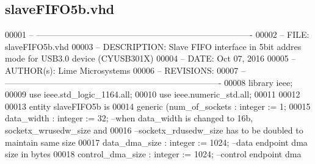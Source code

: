 \subsection{slave\+F\+I\+F\+O5b.\+vhd}
\label{slaveFIFO5b_8vhd_source}

\begin{DoxyCode}
00001 \textcolor{keyword}{-- ---------------------------------------------------------------------------- }
00002 \textcolor{keyword}{-- FILE:    slaveFIFO5b.vhd}
00003 \textcolor{keyword}{-- DESCRIPTION: Slave FIFO interface in 5bit addres mode for USB3.0 device (CYUSB301X)}
00004 \textcolor{keyword}{-- DATE:    Oct 07, 2016}
00005 \textcolor{keyword}{-- AUTHOR(s):   Lime Microsystems}
00006 \textcolor{keyword}{-- REVISIONS:}
00007 \textcolor{keyword}{-- ---------------------------------------------------------------------------- }
00008 \textcolor{vhdlkeyword}{library }\textcolor{keywordflow}{ieee};
00009 \textcolor{vhdlkeyword}{use }ieee.std\_logic\_1164.\textcolor{keywordflow}{all};
00010 \textcolor{vhdlkeyword}{use }ieee.numeric\_std.\textcolor{keywordflow}{all};
00011 
00012 
00013 \textcolor{keywordflow}{entity }slaveFIFO5b \textcolor{keywordflow}{is}
00014     \textcolor{keywordflow}{generic} \textcolor{vhdlchar}{(}\textcolor{vhdlchar}{num_of_sockets}         \textcolor{vhdlchar}{:} \textcolor{comment}{integer} \textcolor{vhdlchar}{:=} \textcolor{vhdllogic}{}\textcolor{vhdllogic}{1};
00015                 \textcolor{vhdlchar}{data_width}              \textcolor{vhdlchar}{:} \textcolor{comment}{integer} \textcolor{vhdlchar}{:=} \textcolor{vhdllogic}{}\textcolor{vhdllogic}{32};\textcolor{keyword}{                                --when data\_width
       is changed to 16b, socketx\_wrusedw\_size and }
00016 \textcolor{keyword}{                                                                                                
      --socketx\_rdusedw\_size has to be doubled to maintain same size}
00017                 \textcolor{vhdlchar}{data_dma_size}           \textcolor{vhdlchar}{:} \textcolor{comment}{integer} \textcolor{vhdlchar}{:=} \textcolor{vhdllogic}{}\textcolor{vhdllogic}{1024};\textcolor{keyword}{                          --data endpoint dma
       size in bytes}
00018                 \textcolor{vhdlchar}{control_dma_size}        \textcolor{vhdlchar}{:} \textcolor{comment}{integer} \textcolor{vhdlchar}{:=} \textcolor{vhdllogic}{}\textcolor{vhdllogic}{1024};\textcolor{keyword}{                          --control endpoint dma
}
\end{DoxyCode}
